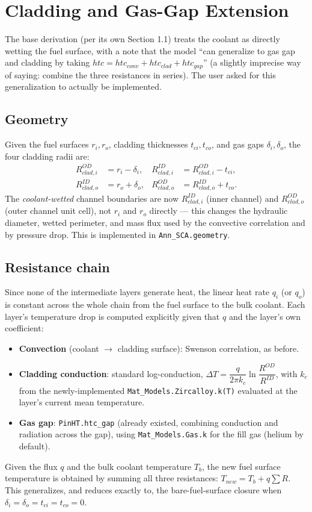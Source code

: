 \documentclass[11pt]{article}
\begin{document}
\section{Cladding and Gas-Gap Extension}
\label{sec:cladding}

The base derivation (per its own Section 1.1) treats the coolant as
directly wetting the fuel surface, with a note that the model
``can generalize to gas gap and cladding by taking $htc = htc_{conv} +
htc_{clad} + htc_{gap}$'' (a slightly imprecise way of saying: combine the
three resistances in series). The user asked for this generalization to
actually be implemented.

\subsection{Geometry}

Given the fuel surfaces $r_i, r_o$, cladding thicknesses $t_{ci}, t_{co}$,
and gas gaps $\delta_i, \delta_o$, the four cladding radii are:
\begin{align}
R_{clad,i}^{OD} &= r_i - \delta_i, &
R_{clad,i}^{ID} &= R_{clad,i}^{OD} - t_{ci}, \\
R_{clad,o}^{ID} &= r_o + \delta_o, &
R_{clad,o}^{OD} &= R_{clad,o}^{ID} + t_{co}.
\end{align}
The \emph{coolant-wetted} channel boundaries are now $R_{clad,i}^{ID}$
(inner channel) and $R_{clad,o}^{OD}$ (outer channel unit cell), not $r_i$
and $r_o$ directly --- this changes the hydraulic diameter, wetted
perimeter, and mass flux used by the convective correlation and by
pressure drop. This is implemented in \texttt{Ann\_SCA.geometry}.

\subsection{Resistance chain}

Since none of the intermediate layers generate heat, the linear heat rate
$q_i$ (or $q_o$) is constant across the whole chain from the fuel surface
to the bulk coolant. Each layer's temperature drop is computed explicitly
given that $q$ and the layer's own coefficient:
\begin{itemize}
\item \textbf{Convection} (coolant $\to$ cladding surface): Swenson
correlation, as before.
\item \textbf{Cladding conduction}: standard log-conduction,
$\Delta T = \dfrac{q}{2\pi k_c}\ln\!\dfrac{R^{OD}}{R^{ID}}$, with $k_c$ from
the newly-implemented \texttt{Mat\_Models.Zircalloy.k(T)} evaluated at the
layer's current mean temperature.
\item \textbf{Gas gap}: \texttt{PinHT.htc\_gap} (already existed, combining
conduction and radiation across the gap), using
\texttt{Mat\_Models.Gas.k} for the fill gas (helium by default).
\end{itemize}
Given the flux $q$ and the bulk coolant temperature $T_b$, the new fuel
surface temperature is obtained by summing all three resistances:
$T_{new} = T_b + q\sum R$. This generalizes, and reduces exactly to, the
bare-fuel-surface closure when $\delta_i = \delta_o = t_{ci} = t_{co} = 0$.
\end{document}
